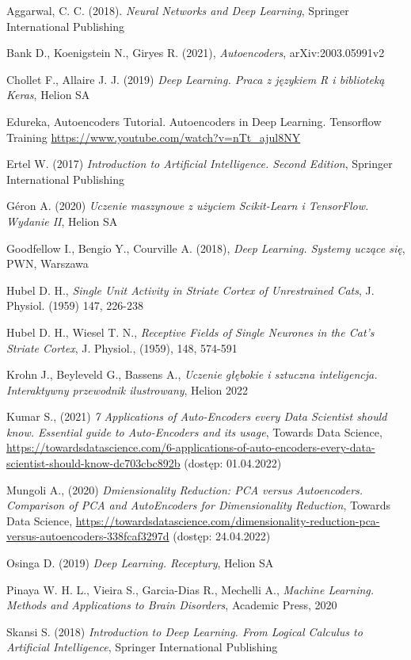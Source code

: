 \documentclass[12pt]{mwbk}
\theoremstyle{plain}
\theoremstyle{definition}
\theoremstyle{remark}
\begin{document}
\begin{thebibliography}{99}

 Aggarwal, C. C. (2018).\emph{ Neural Networks and Deep Learning}, Springer International Publishing

 Bank D., Koenigstein N., Giryes R. (2021), \emph{Autoencoders}, arXiv:2003.05991v2

 Chollet F., Allaire J. J. (2019) \emph{Deep Learning. Praca z językiem R i biblioteką Keras}, Helion SA

 Edureka, Autoencoders Tutorial. Autoencoders in Deep Learning. Tensorflow Training \url{https://www.youtube.com/watch?v=nTt_ajul8NY} 

 Ertel W. (2017) \emph{Introduction to Artificial Intelligence. Second Edition}, Springer International Publishing

 G\'eron A. (2020) \emph{Uczenie maszynowe z użyciem Scikit-Learn i TensorFlow. Wydanie II}, Helion SA

 Goodfellow I., Bengio Y., Courville A. (2018), \emph{Deep Learning. Systemy uczące się}, PWN, Warszawa 

 Hubel D. H., \emph{Single Unit Activity in  Striate Cortex of Unrestrained Cats}, J. Physiol. (1959) 147, 226-238

 Hubel D. H., Wiesel T. N., \emph{Receptive Fields of Single Neurones in the Cat's Striate Cortex}, J. Physiol., (1959), 148, 574-591

 Krohn J., Beyleveld G., Bassens A., \emph{Uczenie głębokie i sztuczna inteligencja. Interaktywny przewodnik ilustrowany}, Helion 2022

 Kumar S., (2021) \emph{7 Applications of Auto-Encoders every Data Scientist  should know. Essential guide to Auto-Encoders and its usage}, Towards Data Science, \url{https://towardsdatascience.com/6-applications-of-auto-encoders-every-data-scientist-should-know-dc703cbc892b} (dostęp: 01.04.2022)

 Mungoli A., (2020) \emph{Dmiensionality Reduction: PCA versus Autoencoders. Comparison of PCA and AutoEncoders for Dimensionality Reduction}, Towards Data Science, \url{https://towardsdatascience.com/dimensionality-reduction-pca-versus-autoencoders-338fcaf3297d} (dostęp: 24.04.2022)

 Osinga D. (2019) \emph{Deep Learning. Receptury}, Helion SA

 Pinaya W. H. L., Vieira S., Garcia-Dias R., Mechelli A., \emph{Machine Learning. Methods and Applications to Brain Disorders}, Academic Press,
2020

 Skansi S. (2018) \emph{Introduction to Deep Learning. From Logical Calculus to Artificial Intelligence}, Springer International Publishing




\end{thebibliography}
\end{document}
